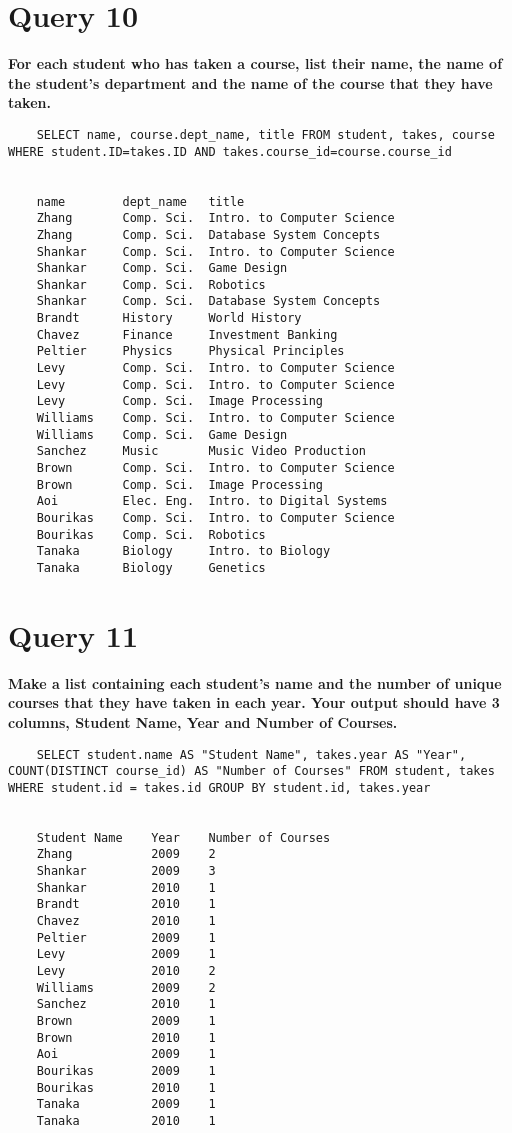 \documentclass[letterpaper]{article}
\begin{document}
\section{Query 10}

    \textbf{For each student who has taken a course, list their name, the name of the student's department and the name of the course that they have taken.}
    \begin{lstlisting}
    SELECT name, course.dept_name, title FROM student, takes, course WHERE student.ID=takes.ID AND takes.course_id=course.course_id
    
    
    name    	dept_name	title	
    Zhang	    Comp. Sci.	Intro. to Computer Science	
    Zhang   	Comp. Sci.	Database System Concepts	
    Shankar 	Comp. Sci.	Intro. to Computer Science	
    Shankar 	Comp. Sci.	Game Design	
    Shankar 	Comp. Sci.	Robotics	
    Shankar 	Comp. Sci.	Database System Concepts	
    Brandt  	History	    World History	
    Chavez  	Finance	    Investment Banking	
    Peltier 	Physics	    Physical Principles	
    Levy    	Comp. Sci.	Intro. to Computer Science	
    Levy    	Comp. Sci.	Intro. to Computer Science	
    Levy    	Comp. Sci.	Image Processing	
    Williams	Comp. Sci.	Intro. to Computer Science	
    Williams	Comp. Sci.	Game Design	
    Sanchez 	Music	    Music Video Production	
    Brown   	Comp. Sci.	Intro. to Computer Science	
    Brown   	Comp. Sci.	Image Processing	
    Aoi 	    Elec. Eng.	Intro. to Digital Systems	
    Bourikas    Comp. Sci.	Intro. to Computer Science	
    Bourikas    Comp. Sci.	Robotics	
    Tanaka  	Biology	    Intro. to Biology	
    Tanaka  	Biology	    Genetics       
    \end{lstlisting}
        
\section{Query 11}

    \textbf{Make a list containing each student's name and the number of unique courses that they have taken in each year.  Your output should have 3 columns, Student Name, Year and Number of Courses.}
    \begin{lstlisting}
    SELECT student.name AS "Student Name", takes.year AS "Year", COUNT(DISTINCT course_id) AS "Number of Courses" FROM student, takes WHERE student.id = takes.id GROUP BY student.id, takes.year
    
    
    Student Name	Year	Number of Courses	
    Zhang	        2009	2	
    Shankar	        2009	3	
    Shankar	        2010	1	
    Brandt	        2010	1	
    Chavez	        2010	1	
    Peltier	        2009	1	
    Levy	        2009	1	
    Levy	        2010	2	
    Williams	    2009	2	
    Sanchez	        2010	1	
    Brown	        2009	1	
    Brown	        2010	1	
    Aoi	            2009	1	
    Bourikas        2009	1	
    Bourikas    	2010	1	
    Tanaka	        2009	1	
    Tanaka	        2010	1
    \end{lstlisting}
        
\end{document}
